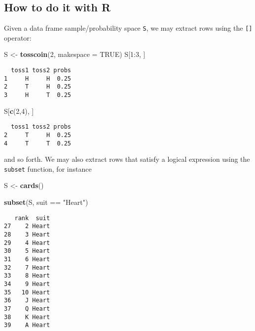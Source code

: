 \documentclass[]{book}
\newenvironment{Shaded}{\begin{snugshade}}{\end{snugshade}}
\newcommand{\KeywordTok}[1]{\textcolor[rgb]{0.13,0.29,0.53}{\textbf{{#1}}}}
\newcommand{\DataTypeTok}[1]{\textcolor[rgb]{0.13,0.29,0.53}{{#1}}}
\newcommand{\DecValTok}[1]{\textcolor[rgb]{0.00,0.00,0.81}{{#1}}}
\newcommand{\StringTok}[1]{\textcolor[rgb]{0.31,0.60,0.02}{{#1}}}
\newcommand{\OtherTok}[1]{\textcolor[rgb]{0.56,0.35,0.01}{{#1}}}
\newcommand{\NormalTok}[1]{{#1}}
\numberwithin{equation}{chapter}
\numberwithin{figure}{chapter}
\theoremstyle{plain}
\theoremstyle{definition}
\theoremstyle{remark}
\theoremstyle{definition}
\theoremstyle{definition}
\theoremstyle{remark}
\begin{document}
\subsection{How to do it with R}\label{how-to-do-it-with-r-10}

Given a data frame sample/probability space \texttt{S}, we may extract
rows using the \texttt{{[}{]}} operator:

\begin{Shaded}
\begin{Highlighting}[]
\NormalTok{S <-}\StringTok{ }\KeywordTok{tosscoin}\NormalTok{(}\DecValTok{2}\NormalTok{, }\DataTypeTok{makespace =} \OtherTok{TRUE}\NormalTok{) }
\NormalTok{S[}\DecValTok{1}\NormalTok{:}\DecValTok{3}\NormalTok{, ] }
\end{Highlighting}
\end{Shaded}

\begin{verbatim}
  toss1 toss2 probs
1     H     H  0.25
2     T     H  0.25
3     H     T  0.25
\end{verbatim}

\begin{Shaded}
\begin{Highlighting}[]
\NormalTok{S[}\KeywordTok{c}\NormalTok{(}\DecValTok{2}\NormalTok{,}\DecValTok{4}\NormalTok{), ] }
\end{Highlighting}
\end{Shaded}

\begin{verbatim}
  toss1 toss2 probs
2     T     H  0.25
4     T     T  0.25
\end{verbatim}

and so forth. We may also extract rows that satisfy a logical expression
using the \texttt{subset} function, for instance

\begin{Shaded}
\begin{Highlighting}[]
\NormalTok{S <-}\StringTok{ }\KeywordTok{cards}\NormalTok{() }
\end{Highlighting}
\end{Shaded}

\begin{Shaded}
\begin{Highlighting}[]
\KeywordTok{subset}\NormalTok{(S, suit ==}\StringTok{ "Heart"}\NormalTok{) }
\end{Highlighting}
\end{Shaded}

\begin{verbatim}
   rank  suit
27    2 Heart
28    3 Heart
29    4 Heart
30    5 Heart
31    6 Heart
32    7 Heart
33    8 Heart
34    9 Heart
35   10 Heart
36    J Heart
37    Q Heart
38    K Heart
39    A Heart
\end{verbatim}
\end{document}
